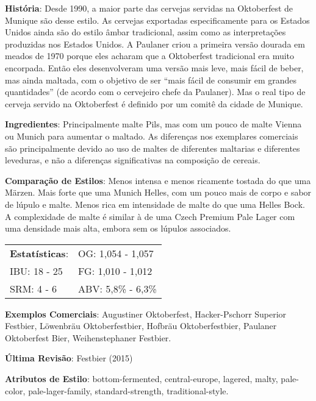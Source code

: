 \textbf{História}: Desde 1990, a maior parte das cervejas servidas na Oktoberfest de Munique são desse estilo. As cervejas exportadas especificamente para os Estados Unidos ainda são do estilo âmbar tradicional, assim como as interpretações produzidas nos Estados Unidos. A Paulaner criou a primeira versão dourada em meados de 1970 porque eles acharam que a Oktoberfest tradicional era muito encorpada. Então eles desenvolveram uma versão mais leve, mais fácil de beber, mas ainda maltada, com o objetivo de ser “mais fácil de consumir em grandes quantidades” (de acordo com o cervejeiro chefe da Paulaner). Mas o real tipo de cerveja servido na Oktoberfest é definido por um comitê da cidade de Munique.

\textbf{Ingredientes}: Principalmente malte Pils, mas com um pouco de malte Vienna ou Munich para aumentar o maltado. As diferenças nos exemplares comerciais são principalmente devido ao uso de maltes de diferentes maltarias e diferentes leveduras, e não a diferenças significativas na composição de cereais.

\textbf{Comparação de Estilos}: Menos intensa e menos ricamente tostada do que uma Märzen. Mais forte que uma Munich Helles, com um pouco mais de corpo e sabor de lúpulo e malte. Menos rica em intensidade de malte do que uma Helles Bock. A complexidade de malte é similar à de uma Czech Premium Pale Lager com uma densidade mais alta, embora sem os lúpulos associados.

\begin{tabular}{@{}p{35mm}p{35mm}@{}}
  \textbf{Estatísticas}: & OG: 1,054 - 1,057 \\
  IBU: 18 - 25  & FG: 1,010 - 1,012  \\
  SRM: 4 - 6   & ABV: 5,8\% - 6,3\%
\end{tabular}

\textbf{Exemplos Comerciais}: Augustiner Oktoberfest, Hacker-Pschorr Superior Festbier, Löwenbräu Oktoberfestbier, Hofbräu Oktoberfestbier, Paulaner Oktoberfest Bier, Weihenstephaner Festbier.

\textbf{Última Revisão}: Festbier (2015)

\textbf{Atributos de Estilo}: bottom-fermented, central-europe, lagered, malty, pale-color, pale-lager-family, standard-strength, traditional-style.
